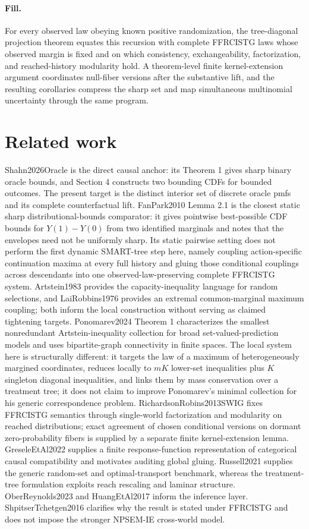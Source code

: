 \documentclass{article}
\begin{document}
\paragraph{Fill.} For every observed law obeying known positive randomization, the tree-diagonal projection theorem equates this recursion with complete FFRCISTG laws whose observed margin is fixed and on which consistency, exchangeability, factorization, and reached-history modularity hold. A theorem-level finite kernel-extension argument coordinates null-fiber versions after the substantive lift, and the resulting corollaries compress the sharp set and map simultaneous multinomial uncertainty through the same program.

\section{Related work}

Shahn2026Oracle is the direct causal anchor: its Theorem 1 gives sharp binary oracle bounds, and Section 4 constructs two bounding CDFs for bounded outcomes. The present target is the distinct interior set of discrete oracle pmfs and its complete counterfactual lift. FanPark2010 Lemma 2.1 is the closest static sharp distributional-bounds comparator: it gives pointwise best-possible CDF bounds for \(Y(1)-Y(0)\) from two identified marginals and notes that the envelopes need not be uniformly sharp. Its static pairwise setting does not perform the first dynamic SMART-tree step here, namely coupling action-specific continuation maxima at every full history and gluing those conditional couplings across descendants into one observed-law-preserving complete FFRCISTG system. Artstein1983 provides the capacity-inequality language for random selections, and LaiRobbins1976 provides an extremal common-marginal maximum coupling; both inform the local construction without serving as claimed tightening targets. Ponomarev2024 Theorem 1 characterizes the smallest nonredundant Artstein-inequality collection for broad set-valued-prediction models and uses bipartite-graph connectivity in finite spaces. The local system here is structurally different: it targets the law of a maximum of heterogeneously margined coordinates, reduces locally to \(mK\) lower-set inequalities plus \(K\) singleton diagonal inequalities, and links them by mass conservation over a treatment tree; it does not claim to improve Ponomarev's minimal collection for his generic correspondence problem. RichardsonRobins2013SWIG fixes FFRCISTG semantics through single-world factorization and modularity on reached distributions; exact agreement of chosen conditional versions on dormant zero-probability fibers is supplied by a separate finite kernel-extension lemma. GreseleEtAl2022 supplies a finite response-function representation of categorical causal compatibility and motivates auditing global gluing. Russell2021 supplies the generic random-set and optimal-transport benchmark, whereas the treatment-tree formulation exploits reach rescaling and laminar structure. OberReynolds2023 and HuangEtAl2017 inform the inference layer. ShpitserTchetgen2016 clarifies why the result is stated under FFRCISTG and does not impose the stronger NPSEM-IE cross-world model.
\end{document}
